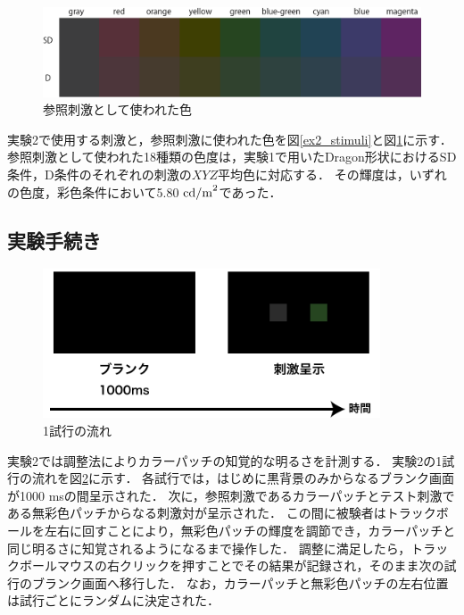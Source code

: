             \begin{figure}[h]
                \centering
                \includegraphics[width=14.0cm]{./img/ex2_stimuli_p.png}
                \caption{参照刺激として使われた色}
                \label{ex2_stimuli_set}
            \end{figure}
            \newpage

            実験2で使用する刺激と，参照刺激に使われた色を図\ref{ex2_stimuli}と図\ref{ex2_stimuli_set}に示す．
            参照刺激として使われた18種類の色度は，実験1で用いたDragon形状におけるSD条件，D条件のそれぞれの刺激の$XYZ$平均色に対応する．
            その輝度は，いずれの色度，彩色条件において5.80 ${\rm cd/m}^2$であった．

        \subsection{実験手続き}

            \begin{figure}[h]
                \centering
                \includegraphics[width=10.0cm]{./img/ex2_procedure.png}
                \caption{1試行の流れ}
                \label{ex2_procedure}
            \end{figure}

            実験2では調整法によりカラーパッチの知覚的な明るさを計測する．
            実験2の1試行の流れを図\ref{ex2_procedure}に示す．
            各試行では，はじめに黒背景のみからなるブランク画面が1000 msの間呈示された．
            次に，参照刺激であるカラーパッチとテスト刺激である無彩色パッチからなる刺激対が呈示された．
            この間に被験者はトラックボールを左右に回すことにより，無彩色パッチの輝度を調節でき，カラーパッチと同じ明るさに知覚されるようになるまで操作した．
            調整に満足したら，トラックボールマウスの右クリックを押すことでその結果が記録され，そのまま次の試行のブランク画面へ移行した．
            なお，カラーパッチと無彩色パッチの左右位置は試行ごとにランダムに決定された．

